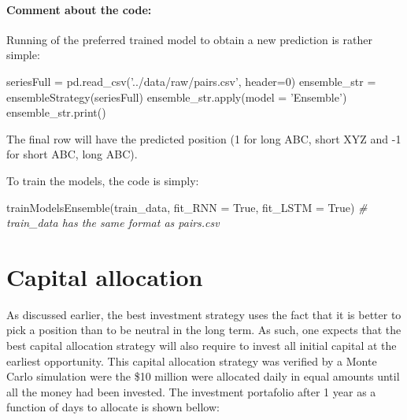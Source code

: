 \documentclass[11pt]{article}
\newenvironment{Shaded}{}{}
\newcommand{\DecValTok}[1]{\textcolor[rgb]{0.25,0.63,0.44}{{#1}}}
\newcommand{\StringTok}[1]{\textcolor[rgb]{0.25,0.44,0.63}{{#1}}}
\newcommand{\CommentTok}[1]{\textcolor[rgb]{0.38,0.63,0.69}{\textit{{#1}}}}
\newcommand{\NormalTok}[1]{{#1}}
\newcommand{\VariableTok}[1]{\textcolor[rgb]{0.10,0.09,0.49}{{#1}}}
\newcommand{\OperatorTok}[1]{\textcolor[rgb]{0.40,0.40,0.40}{{#1}}}
\newcommand{\BuiltInTok}[1]{{#1}}
\begin{document}
\hypertarget{comment-about-the-code}{%
\paragraph{Comment about the code:}\label{comment-about-the-code}}

Running of the preferred trained model to obtain a new prediction is
rather simple:

\begin{Shaded}
\begin{Highlighting}[]
\NormalTok{seriesFull }\OperatorTok{=}\NormalTok{ pd.read_csv(}\StringTok{'../data/raw/pairs.csv'}\NormalTok{, header}\OperatorTok{=}\DecValTok{0}\NormalTok{) }
\NormalTok{ensemble_str }\OperatorTok{=}\NormalTok{ ensembleStrategy(seriesFull)}
\NormalTok{ensemble_str.}\BuiltInTok{apply}\NormalTok{(model }\OperatorTok{=} \StringTok{'Ensemble'}\NormalTok{)}
\NormalTok{ensemble_str.}\BuiltInTok{print}\NormalTok{()}
\end{Highlighting}
\end{Shaded}

The final row will have the predicted position (1 for long ABC, short
XYZ and -1 for short ABC, long ABC).

To train the models, the code is simply:

\begin{Shaded}
\begin{Highlighting}[]
\NormalTok{trainModelsEnsemble(train_data, fit_RNN }\OperatorTok{=} \VariableTok{True}\NormalTok{, fit_LSTM }\OperatorTok{=} \VariableTok{True}\NormalTok{) }
            \CommentTok{# train_data has the same format as pairs.csv}
\end{Highlighting}
\end{Shaded}

    \hypertarget{capital-allocation}{%
\section{Capital allocation}\label{capital-allocation}}

As discussed earlier, the best investment strategy uses the fact that it
is better to pick a position than to be neutral in the long term. As
such, one expects that the best capital allocation strategy will also
require to invest all initial capital at the earliest opportunity. This
capital allocation strategy was verified by a Monte Carlo simulation
were the \$10 million were allocated daily in equal amounts until all
the money had been invested. The investment portafolio after 1 year as a
function of days to allocate is shown bellow:
\end{document}
